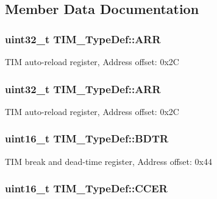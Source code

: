 \subsection{Member Data Documentation}
\hypertarget{struct_t_i_m___type_def_a6a42766a6ca3c7fe10a810ebd6b9d627}{
\subsubsection[{A\-R\-R}]{ uint32\-\_\-t T\-I\-M\-\_\-\-Type\-Def\-::\-A\-R\-R}}\label{struct_t_i_m___type_def_a6a42766a6ca3c7fe10a810ebd6b9d627}
T\-I\-M auto-\/reload register, Address offset\-: 0x2\-C \hypertarget{struct_t_i_m___type_def_a6a42766a6ca3c7fe10a810ebd6b9d627}{
\subsubsection[{A\-R\-R}]{ uint32\-\_\-t T\-I\-M\-\_\-\-Type\-Def\-::\-A\-R\-R}}\label{struct_t_i_m___type_def_a6a42766a6ca3c7fe10a810ebd6b9d627}
T\-I\-M auto-\/reload register, Address offset\-: 0x2\-C \hypertarget{struct_t_i_m___type_def_a32bbedb8b418359c6873375ec949cf8b}{
\subsubsection[{B\-D\-T\-R}]{ uint16\-\_\-t T\-I\-M\-\_\-\-Type\-Def\-::\-B\-D\-T\-R}}\label{struct_t_i_m___type_def_a32bbedb8b418359c6873375ec949cf8b}
T\-I\-M break and dead-\/time register, Address offset\-: 0x44 \hypertarget{struct_t_i_m___type_def_a2a7ebf9d3041dc20da591668d916f5bc}{
\subsubsection[{C\-C\-E\-R}]{ uint16\-\_\-t T\-I\-M\-\_\-\-Type\-Def\-::\-C\-C\-E\-R}}\label{struct_t_i_m___type_def_a2a7ebf9d3041dc20da591668d916f5bc}

